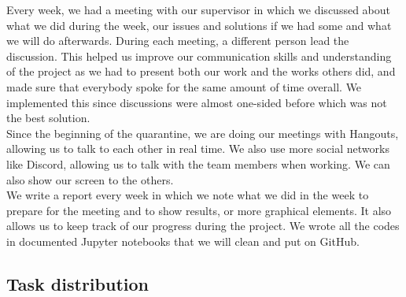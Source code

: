 Every week, we had a meeting with our supervisor in which we discussed about
what we did during the week, our issues and solutions if we had some and what
we will do afterwards. During each meeting, a different person lead the
discussion. This helped us improve our communication skills and understanding
of the project as we had to present both our work and the works others did, 
and made sure that everybody spoke for the same amount of time overall. 
We implemented this since
discussions were almost one-sided before which was not the best solution.\\
Since the beginning of the quarantine, we are doing our meetings with Hangouts,
allowing us to talk to each other in real time. We also use more social networks
like Discord, allowing us to talk with the team members when working. We can also
show our screen to the others. \\

We write a report every week in which we note what we did in
the week to prepare for the meeting and to show results, or more graphical
elements. It also allows us to keep track of our progress during the project.
We wrote all the codes in documented Jupyter notebooks that we will clean and put on GitHub. \\

\subsection{Task distribution}

